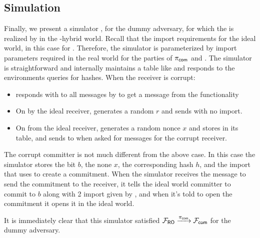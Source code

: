 \subsection{Simulation}
Finally, we present a simulator \simcom, for the dummy adversary, for which the \Fcom is realized by  in the \Fropp-hybrid world.
Recall that the import requirements for the ideal world, in this case for \Fcom. Therefore, the simulator is parameterized by import parameters required in the real world for the parties of $\pi_{\mathsf{com}}$ and \Fro.
The simulator is straightforward and internally maintains a table like \Fro and responds to the environments queries for hashes. 
When the receiver is corrupt:
\begin{itemize}
\item \simcom responds with  to all messages by \Z to get a message from the functionality
\item On  by the ideal receiver, \simcom generates a random $r$ and sends  with no import.
\item On  from the ideal receiver, \simcom generates a random nonce $x$ and stores  in its \Fro table, and sends  to \Z when asked for messages for the corrupt receiver.
\end{itemize}

The corrupt committer is not much different from the above case. In this case
the simulator stores the bit $b$, the none $x$, the corresponding hash $h$, and the import that \Z uses to create a commitment.
When the simulator receives the message to send the commitment to the receiver, it tells the ideal world committer to commit to $b$ along with 2 import given by \Z, and when it's told to open the commitment it opens it in the ideal world. 

It is immediately clear that this simulator satisfied $\mathcal{F}_{{\mathsf {RO}}} \xrightarrow{\pi_{{\mathsf {com}}}} \mathcal{F}_{{\mathsf {com}}}$ for the dummy adversary.


